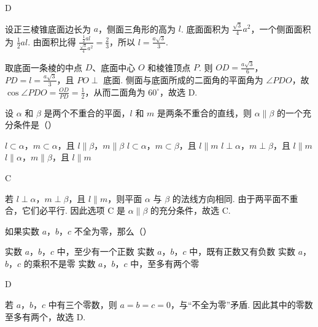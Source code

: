 \documentclass[UTF8,a4paper,oneside,11pt]{ctexbook}
\begin{document}
\begin{answer}D\end{answer}

\begin{solution}
设正三棱锥底面边长为 \(a\)，侧面三角形的高为 \(l\). 底面面积为 \(\frac{\sqrt3}{4}a^{2}\)，一个侧面面积为 \(\frac12al\). 由面积比得 \(\frac{\frac12al}{\frac{\sqrt3}{4}a^{2}}=\frac23\)，所以 \(l=\frac{a\sqrt3}{3}\).

取底面一条棱的中点 \(D\)、底面中心 \(O\) 和棱锥顶点 \(P\). 则 \(OD=\frac{a\sqrt3}{6}\)，\(PD=l=\frac{a\sqrt3}{3}\)，且 \(PO\perp\) 底面. 侧面与底面所成的二面角的平面角为 \(\angle PDO\)，故 \(\cos\angle PDO=\frac{OD}{PD}=\frac12\)，从而二面角为 \(60^{\circ}\)，故选 D.
\end{solution}

\begin{problem}
设 \(\alpha\) 和 \(\beta\) 是两个不重合的平面，\(l\) 和 \(m\) 是两条不重合的直线，则 \(\alpha\parallel\beta\) 的一个充分条件是（\quad）

\choices
{\(l\subset\alpha\)，\(m\subset\alpha\)，且 \(l\parallel\beta\)，\(m\parallel\beta\)}
{\(l\subset\alpha\)，\(m\subset\beta\)，且 \(l\parallel m\)}
{\(l\perp\alpha\)，\(m\perp\beta\)，且 \(l\parallel m\)}
{\(l\parallel\alpha\)，\(m\parallel\beta\)，且 \(l\parallel m\)}
\end{problem}

\begin{answer}C\end{answer}

\begin{solution}
若 \(l\perp\alpha\)，\(m\perp\beta\)，且 \(l\parallel m\)，则平面 \(\alpha\) 与 \(\beta\) 的法线方向相同. 由于两平面不重合，它们必平行. 因此选项 C 是 \(\alpha\parallel\beta\) 的充分条件，故选 C.
\end{solution}

\begin{problem}
如果实数 \(a\)，\(b\)，\(c\) 不全为零，那么（\quad）

\choices
{实数 \(a\)，\(b\)，\(c\) 中，至少有一个正数}
{实数 \(a\)，\(b\)，\(c\) 中，既有正数又有负数}
{实数 \(a\)，\(b\)，\(c\) 的乘积不是零}
{实数 \(a\)，\(b\)，\(c\) 中，至多有两个零}
\end{problem}

\begin{answer}D\end{answer}

\begin{solution}
若 \(a\)，\(b\)，\(c\) 中有三个零数，则 \(a=b=c=0\)，与“不全为零”矛盾. 因此其中的零数至多有两个，故选 D.
\end{solution}
\end{document}
